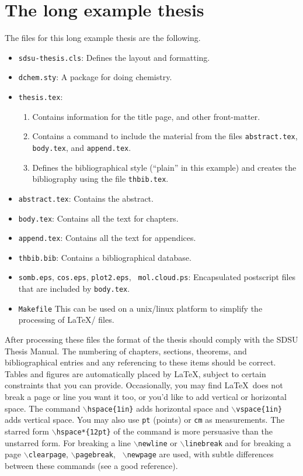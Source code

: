 \section{The long example thesis}
\label{s:long}
The files for this long example
thesis are the following.
\begin{itemize}
\item {\tt sdsu-thesis.cls}: Defines the layout and formatting.
\item {\tt dchem.sty}: A package for doing chemistry.
\item {\tt thesis.tex}: 
\begin{enumerate}
\item  Contains information for the title page, and other
front-matter.
\item Contains a command to include the material from  the files 
{\tt abstract.tex},  {\tt body.tex}, and {\tt append.tex}.
\item Defines the bibliographical style (``plain'' in this example)
  and creates the bibliography using the file {\tt thbib.tex}. 
\end{enumerate}
\item {\tt abstract.tex}: Contains the abstract.
\item {\tt body.tex}: Contains all the text for chapters. 
\item {\tt append.tex}: Contains all the text for appendices.
\item {\tt thbib.bib}:  Contains a bibliographical database.
\item {\tt somb.eps}, {\tt cos.eps}, {\tt plot2.eps}, {\tt
  mol.cloud.ps}:  
Encapsulated postscript files 
that are included by {\tt body.tex}.
\item {\tt Makefile} This can be used on a unix/linux platform to
simplify the processing of \LaTeX/ files.
\end{itemize}

After processing these files the format of the thesis should comply
with the SDSU Thesis Manual.  The numbering of chapters, sections,
theorems, and bibliographical entries and any referencing to these
items should be correct.  Tables and figures are automatically placed
by \LaTeX, subject to certain constraints that you can provide.  
Occasionally, you may find  \LaTeX\ does not break a page or line  you
want it too, or you'd like to add vertical or horizontal space.
The command {\tt $\backslash$hspace\{1in\}} adds horizontal space and
{\tt $\backslash$vspace\{1in\}} adds vertical space.  You may also use
{\tt pt} (points) or {\tt cm} as 
measurements.  The  starred form {\tt $\backslash$hspace*\{12pt\}} of the command
is more persuasive than the unstarred form.  For breaking a line
{\tt $\backslash$newline} or {\tt $\backslash$linebreak} and for
breaking a page {\tt $\backslash$clearpage}, {\tt $\backslash$pagebreak}, {\tt
  $\backslash$newpage} are used, with subtle differences between these
commands (see a good reference). 


